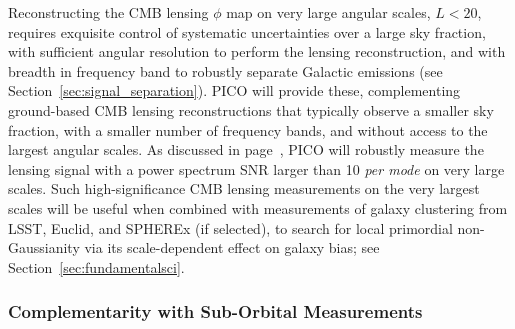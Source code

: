 \documentclass[PICOReport.tex]{subfiles}
\begin{document}
Reconstructing the CMB lensing $\phi$ map on very large angular scales, $L<20$, requires exquisite control of systematic uncertainties over a large sky fraction, with sufficient angular resolution to perform the lensing reconstruction, and with breadth in frequency band to robustly separate Galactic emissions (see Section~\ref{sec:signal_separation}). PICO will provide these, complementing ground-based CMB lensing reconstructions that typically observe a smaller sky fraction, with a smaller number of frequency bands, and without access to the largest angular scales. As discussed in page~\pageref{gravitationallensing}, PICO will robustly measure the lensing signal with a power spectrum \ac{SNR} larger than 10 {\it per mode} on very large scales. Such high-significance CMB lensing measurements on the very largest scales will be useful when combined with measurements of galaxy clustering from LSST, Euclid, and SPHEREx (if selected), 
to search for local primordial non-Gaussianity via its scale-dependent effect on galaxy bias; see Section~\ref{sec:fundamentalsci}.


\subsubsection{Complementarity with Sub-Orbital Measurements}
\end{document}
